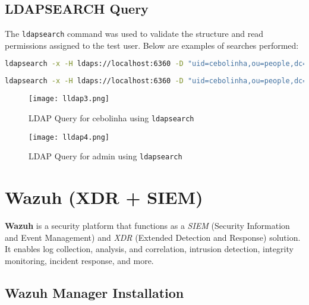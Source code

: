 \documentclass[12pt]{report}
\begin{document}
\subsection*{LDAPSEARCH Query}

The \texttt{ldapsearch} command was used to validate the structure and read permissions assigned to the test user. Below are examples of searches performed:

\begin{lstlisting}[language=bash, caption={LDAP Query for cebolinha}]
ldapsearch -x -H ldaps://localhost:6360 -D "uid=cebolinha,ou=people,dc=example,dc=com" -W -b "dc=example,dc=com" "(cn=cebolinha)"
\end{lstlisting}

\begin{lstlisting}[language=bash, caption={LDAP Query for admin user}]
ldapsearch -x -H ldaps://localhost:6360 -D "uid=cebolinha,ou=people,dc=example,dc=com" -W -b "dc=example,dc=com" "(cn=admin)"
\end{lstlisting}

\begin{figure}[h]
    \centering
    \texttt{[image: lldap3.png]}
    \caption{LDAP Query for cebolinha using \texttt{ldapsearch}}
    \label{fig:lldap-search-cebolinha}
\end{figure}

\begin{figure}[h]
    \centering
    \texttt{[image: lldap4.png]}
    \caption{LDAP Query for admin using \texttt{ldapsearch}}
    \label{fig:lldap-search-admin}
\end{figure}

\clearpage

\section*{Wazuh (XDR + SIEM)}

\textbf{Wazuh} is a security platform that functions as a \textit{SIEM} (Security Information and Event Management) and \textit{XDR} (Extended Detection and Response) solution. It enables log collection, analysis, and correlation, intrusion detection, integrity monitoring, incident response, and more.

\subsection*{Wazuh Manager Installation}
\end{document}
